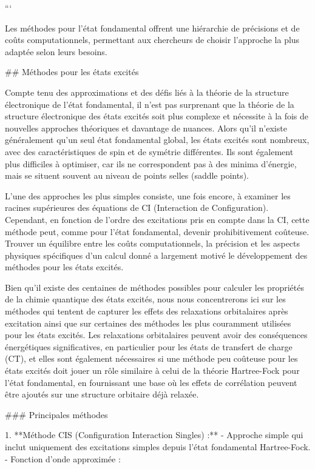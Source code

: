 \documentclass[12pt,a4paper]{report}
\numberwithin{equation}{section}
\numberwithin{figure}{section}
\numberwithin{table}{section}
\begin{document}
\begin{markdown}
\begin{tikzpicture}[
    mybox/.style={draw=black, thick, fill=blue!10, rounded corners, inner sep=10pt},
    title/.style={font=\bfseries}
]
\end{tikzpicture}

```

Les méthodes pour l’état fondamental offrent une hiérarchie de précisions et de coûts computationnels, permettant aux chercheurs de choisir l’approche la plus adaptée selon leurs besoins. 


##  Méthodes pour les états excités

Compte tenu des approximations et des défis liés à la théorie de la structure électronique de l'état fondamental, il n'est pas surprenant que la théorie de la structure électronique des états excités soit plus complexe et nécessite à la fois de nouvelles approches théoriques et davantage de nuances. Alors qu'il n'existe généralement qu'un seul état fondamental global, les états excités sont nombreux, avec des caractéristiques de spin et de symétrie différentes. Ils sont également plus difficiles à optimiser, car ils ne correspondent pas à des minima d'énergie, mais se situent souvent au niveau de points selles (saddle points). 

L'une des approches les plus simples consiste, une fois encore, à examiner les racines supérieures des équations de CI (Interaction de Configuration). Cependant, en fonction de l'ordre des excitations pris en compte dans la CI, cette méthode peut, comme pour l'état fondamental, devenir prohibitivement coûteuse. Trouver un équilibre entre les coûts computationnels, la précision et les aspects physiques spécifiques d'un calcul donné a largement motivé le développement des méthodes pour les états excités. 

Bien qu'il existe des centaines de méthodes possibles pour calculer les propriétés de la chimie quantique des états excités, nous nous concentrerons ici sur les méthodes qui tentent de capturer les effets des relaxations orbitalaires après excitation ainsi que sur certaines des méthodes les plus couramment utilisées pour les états excités. Les relaxations orbitalaires peuvent avoir des conséquences énergétiques significatives, en particulier pour les états de transfert de charge (CT), et elles sont également nécessaires si une méthode peu coûteuse pour les états excités doit jouer un rôle similaire à celui de la théorie Hartree-Fock pour l'état fondamental, en fournissant une base où les effets de corrélation peuvent être ajoutés sur une structure orbitaire déjà relaxée.

### Principales méthodes

1. **Méthode CIS (Configuration Interaction Singles) :**
   - Approche simple qui inclut uniquement des excitations simples depuis l’état fondamental Hartree-Fock.
   - Fonction d’onde approximée :


\end{markdown}
\end{document}
